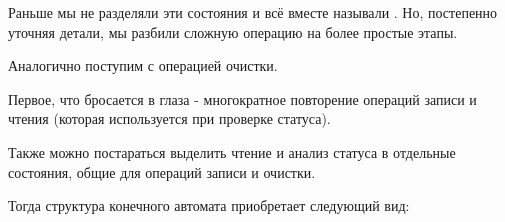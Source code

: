 % 

\par{Раньше мы не разделяли эти состояния и всё вместе называли . Но, постепенно уточняя детали, мы разбили сложную операцию на более простые этапы.}
\par{Аналогично поступим с операцией очистки.}

% 

\par{Первое, что бросается в глаза - многократное повторение операций записи и чтения (которая используется при проверке статуса).}
\par{Также можно постараться выделить чтение и анализ статуса в отдельные состояния, общие для операций записи и очистки.}
\par{Тогда структура конечного автомата приобретает следующий вид:}

% 

